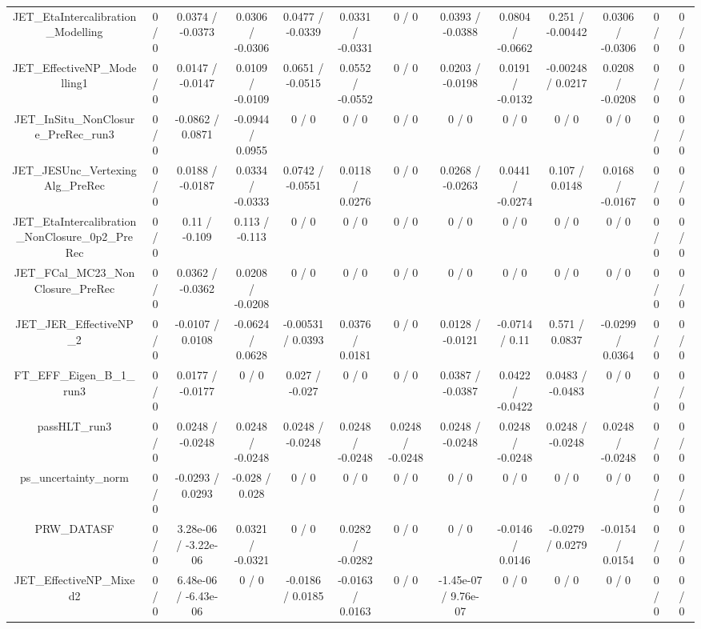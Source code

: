 \documentclass[10pt]{article}
\begin{document}
\begin{table}[htbp]
\begin{center}
\begin{tabular}{|c|c|c|c|c|c|c|c|c|c|c|c|c|}
  JET_EtaIntercalibration_Modelling & 0 / 0 & 0.0374 / -0.0373 & 0.0306 / -0.0306 & 0.0477 / -0.0339 & 0.0331 / -0.0331 & 0 / 0 & 0.0393 / -0.0388 & 0.0804 / -0.0662 & 0.251 / -0.00442 & 0.0306 / -0.0306 & 0 / 0 & 0 / 0 \\ 
  JET_EffectiveNP_Modelling1 & 0 / 0 & 0.0147 / -0.0147 & 0.0109 / -0.0109 & 0.0651 / -0.0515 & 0.0552 / -0.0552 & 0 / 0 & 0.0203 / -0.0198 & 0.0191 / -0.0132 & -0.00248 / 0.0217 & 0.0208 / -0.0208 & 0 / 0 & 0 / 0 \\ 
  JET_InSitu_NonClosure_PreRec_run3 & 0 / 0 & -0.0862 / 0.0871 & -0.0944 / 0.0955 & 0 / 0 & 0 / 0 & 0 / 0 & 0 / 0 & 0 / 0 & 0 / 0 & 0 / 0 & 0 / 0 & 0 / 0 \\ 
  JET_JESUnc_VertexingAlg_PreRec & 0 / 0 & 0.0188 / -0.0187 & 0.0334 / -0.0333 & 0.0742 / -0.0551 & 0.0118 / 0.0276 & 0 / 0 & 0.0268 / -0.0263 & 0.0441 / -0.0274 & 0.107 / 0.0148 & 0.0168 / -0.0167 & 0 / 0 & 0 / 0 \\ 
  JET_EtaIntercalibration_NonClosure_0p2_PreRec & 0 / 0 & 0.11 / -0.109 & 0.113 / -0.113 & 0 / 0 & 0 / 0 & 0 / 0 & 0 / 0 & 0 / 0 & 0 / 0 & 0 / 0 & 0 / 0 & 0 / 0 \\ 
  JET_FCal_MC23_NonClosure_PreRec & 0 / 0 & 0.0362 / -0.0362 & 0.0208 / -0.0208 & 0 / 0 & 0 / 0 & 0 / 0 & 0 / 0 & 0 / 0 & 0 / 0 & 0 / 0 & 0 / 0 & 0 / 0 \\ 
  JET_JER_EffectiveNP_2 & 0 / 0 & -0.0107 / 0.0108 & -0.0624 / 0.0628 & -0.00531 / 0.0393 & 0.0376 / 0.0181 & 0 / 0 & 0.0128 / -0.0121 & -0.0714 / 0.11 & 0.571 / 0.0837 & -0.0299 / 0.0364 & 0 / 0 & 0 / 0 \\ 
  FT_EFF_Eigen_B_1_run3 & 0 / 0 & 0.0177 / -0.0177 & 0 / 0 & 0.027 / -0.027 & 0 / 0 & 0 / 0 & 0.0387 / -0.0387 & 0.0422 / -0.0422 & 0.0483 / -0.0483 & 0 / 0 & 0 / 0 & 0 / 0 \\ 
  passHLT_run3 & 0 / 0 & 0.0248 / -0.0248 & 0.0248 / -0.0248 & 0.0248 / -0.0248 & 0.0248 / -0.0248 & 0.0248 / -0.0248 & 0.0248 / -0.0248 & 0.0248 / -0.0248 & 0.0248 / -0.0248 & 0.0248 / -0.0248 & 0 / 0 & 0 / 0 \\ 
  ps_uncertainty_norm & 0 / 0 & -0.0293 / 0.0293 & -0.028 / 0.028 & 0 / 0 & 0 / 0 & 0 / 0 & 0 / 0 & 0 / 0 & 0 / 0 & 0 / 0 & 0 / 0 & 0 / 0 \\ 
  PRW_DATASF & 0 / 0 & 3.28e-06 / -3.22e-06 & 0.0321 / -0.0321 & 0 / 0 & 0.0282 / -0.0282 & 0 / 0 & 0 / 0 & -0.0146 / 0.0146 & -0.0279 / 0.0279 & -0.0154 / 0.0154 & 0 / 0 & 0 / 0 \\ 
  JET_EffectiveNP_Mixed2 & 0 / 0 & 6.48e-06 / -6.43e-06 & 0 / 0 & -0.0186 / 0.0185 & -0.0163 / 0.0163 & 0 / 0 & -1.45e-07 / 9.76e-07 & 0 / 0 & 0 / 0 & 0 / 0 & 0 / 0 & 0 / 0 \\ 

\end{tabular}
\end{center}
\end{table}
\end{document}
